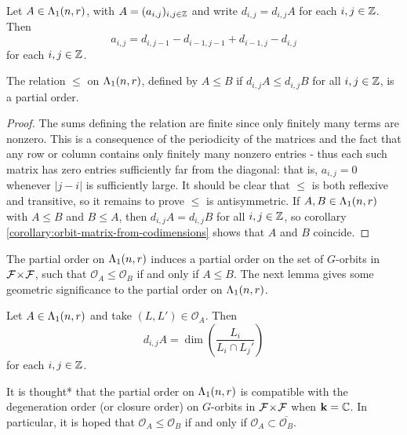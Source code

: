 \documentclass[a4paper, 11pt]{report}
\begin{document}
\begin{corollary}\label{corollary:orbit-matrix-from-codimensions}
Let $A\in\Lambda_1(n,r)$, with $A = (a_{i,j})_{i,j\in\mathbb{Z}}$ and write $d_{i,j}=d_{i,j}A$ for each $i,j\in\mathbb{Z}$. Then
\begin{equation*}
a_{i,j} = d_{i,j-1} - d_{i-1,j-1} + d_{i-1,j} - d_{i,j}
\end{equation*}
for each $i,j\in\mathbb{Z}$.
\end{corollary}

\begin{lemma}\label{lemma:orbit-poset}
The relation $\le$ on $\Lambda_1(n,r)$, defined by $A\le B$ if $d_{i,j}A\le d_{i,j}B$
for all $i,j\in\mathbb{Z}$, is a partial order.
\end{lemma}

\begin{proof}
The sums defining the relation are finite since only finitely many terms are nonzero. This is a consequence of the periodicity of the matrices and the fact that any row or column contains only finitely many nonzero entries - thus each such matrix has zero entries sufficiently far from the diagonal: that is, $a_{i,j} = 0$ whenever $|j-i|$ is sufficiently large. It should be clear that $\le$ is both reflexive and transitive, so it remains to prove $\le$ is antisymmetric. If $A,B\in\Lambda_1(n,r)$ with $A\le B$ and $B\le A$, then $d_{i,j}A=d_{i,j}B$ for all $i,j\in\mathbb{Z}$, so corollary \ref{corollary:orbit-matrix-from-codimensions} shows that $A$ and $B$ coincide. 
\end{proof}

The partial order on $\Lambda_1(n,r)$ induces a partial order on the set of $G$-orbits in ${\mathcal{F}\!\times\!\mathcal{F}}$, such that $\mathcal{O}_A\le \mathcal{O}_B$ if and only if $A\le B$. The next lemma gives some geometric significance to the partial order on $\Lambda_1(n,r)$.

\begin{lemma}
Let $A\in\Lambda_1(n,r)$ and take $(L,L')\in\mathcal{O}_A$. Then
\begin{equation*}
d_{i,j}A = \dim\left(\frac{L_i}{L_i\cap L_j'}\right)
\end{equation*}
for each $i,j\in\mathbb{Z}$.
\end{lemma}

{\color{red}It is thought* that the partial order on $\Lambda_1(n,r)$ is compatible with the degeneration order (or closure order) on $G$-orbits in ${\mathcal{F}\!\times\!\mathcal{F}}$ when $\mathbf{k}=\mathbb{C}$. In particular, it is hoped that $\mathcal{O}_A\le \mathcal{O}_B$ if and only if $\mathcal{O}_A\subset \overline{\mathcal{O}_B}$.}
\end{document}
